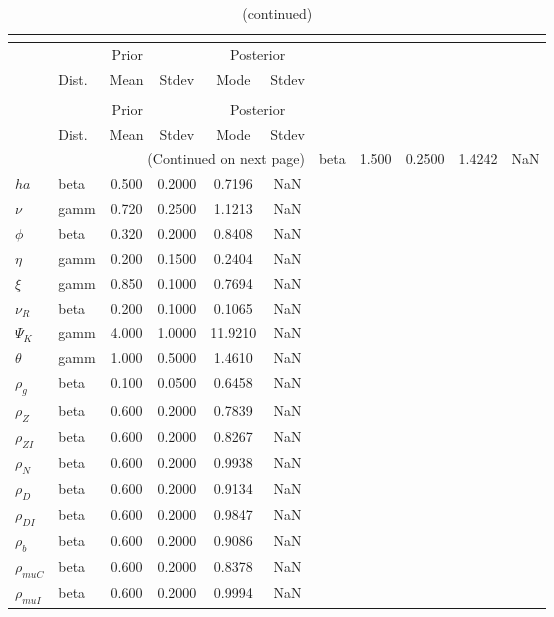  
\begin{center}
\begin{longtable}{llcccc} 
\caption{Results from posterior maximization (parameters)}\\
 \label{Table:Posterior:1}\\
\toprule 
  & \multicolumn{3}{c}{Prior}  &  \multicolumn{2}{c}{Posterior} \\
  \cmidrule(r{.75em}){2-4} \cmidrule(r{.75em}){5-6}
  & Dist. & Mean  & Stdev & Mode & Stdev \\ 
\midrule \endfirsthead 
\caption{(continued)}\\
 \bottomrule 
  & \multicolumn{3}{c}{Prior}  &  \multicolumn{2}{c}{Posterior} \\
  \cmidrule(r{.75em}){2-4} \cmidrule(r{.75em}){5-6}
  & Dist. & Mean  & Stdev & Mode & Stdev \\ 
\midrule \endhead 
\bottomrule \multicolumn{6}{r}{(Continued on next page)}\endfoot 
\bottomrule\endlastfoot 
${\sigma}$ & beta &   1.500 & 0.2500 &   1.4242 &     NaN \\ 
${ha}$ & beta &   0.500 & 0.2000 &   0.7196 &     NaN \\ 
$\nu$ & gamm &   0.720 & 0.2500 &   1.1213 &     NaN \\ 
${\phi}$ & beta &   0.320 & 0.2000 &   0.8408 &     NaN \\ 
${\eta}$ & gamm &   0.200 & 0.1500 &   0.2404 &     NaN \\ 
$\xi$ & gamm &   0.850 & 0.1000 &   0.7694 &     NaN \\ 
${\nu_R}$ & beta &   0.200 & 0.1000 &   0.1065 &     NaN \\ 
${\Psi_{K}}$ & gamm &   4.000 & 1.0000 &  11.9210 &     NaN \\ 
${\theta}$ & gamm &   1.000 & 0.5000 &   1.4610 &     NaN \\ 
${\rho_g}$ & beta &   0.100 & 0.0500 &   0.6458 &     NaN \\ 
${\rho_Z}$ & beta &   0.600 & 0.2000 &   0.7839 &     NaN \\ 
${\rho_{ZI}}$ & beta &   0.600 & 0.2000 &   0.8267 &     NaN \\ 
${\rho_N}$ & beta &   0.600 & 0.2000 &   0.9938 &     NaN \\ 
${\rho_D}$ & beta &   0.600 & 0.2000 &   0.9134 &     NaN \\ 
${\rho_{DI}}$ & beta &   0.600 & 0.2000 &   0.9847 &     NaN \\ 
${\rho_b}$ & beta &   0.600 & 0.2000 &   0.9086 &     NaN \\ 
${\rho_{muC}}$ & beta &   0.600 & 0.2000 &   0.8378 &     NaN \\ 
${\rho_{muI}}$ & beta &   0.600 & 0.2000 &   0.9994 &     NaN \\ 
\end{longtable}
 \end{center}
